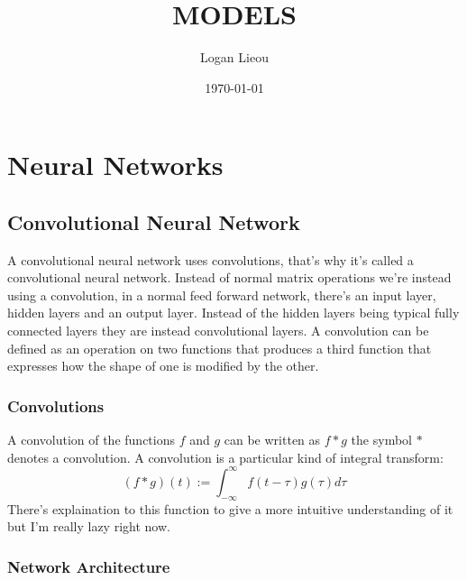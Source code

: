 \documentclass[11pt]{article}
\title{MODELS}
\author{Logan Lieou}
\date{\today}
\begin{document}
\maketitle{}
\newpage

\section{Neural Networks}
\subsection{Convolutional Neural Network}
A convolutional neural network uses convolutions, that's why it's called a convolutional neural network. Instead of normal matrix operations we're instead using a convolution, in a normal feed forward network, there's an input layer, hidden layers and an output layer. Instead of the hidden layers being typical fully connected layers they are instead convolutional layers. A convolution can be defined as an operation on two functions that produces a third function that expresses how the shape of one is modified by the other. \cite{a2017}

\subsubsection{Convolutions}
A convolution of the functions \(f\) and \(g\) can be written as \(f * g\) the symbol \(*\) denotes a convolution.
A convolution is a particular kind of integral transform:
$$
(f*g)(t) := \int_{-\infty}^{\infty}f(t - \tau)g(\tau) d\tau
$$
There's explaination to this function to give a more intuitive understanding of it but I'm really lazy right now.

\subsubsection{Network Architecture}
\end{document}
